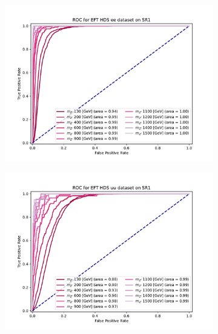 \documentclass[12pt, a4paper]{book}
\begin{document}
\begin{figure}[!ht]
   \hfill
   \begin{subfigure}[b]{0.49\textwidth}
      \centering
      \includegraphics[width=1\textwidth]{XGBoost/Model_independent/50-100/EFT_HDS/ROC_ee.pdf}
   \end{subfigure}
   \hfill
   \begin{subfigure}[b]{0.49\textwidth}
      \centering
      \includegraphics[width=1\textwidth]{XGBoost/Model_independent/50-100/EFT_HDS/ROC_uu.pdf}
   \end{subfigure}
   \hfill
	\begin{subfigure}[b]{0.49\textwidth}
      \centering

\end{subfigure}
\end{figure}
\end{document}
